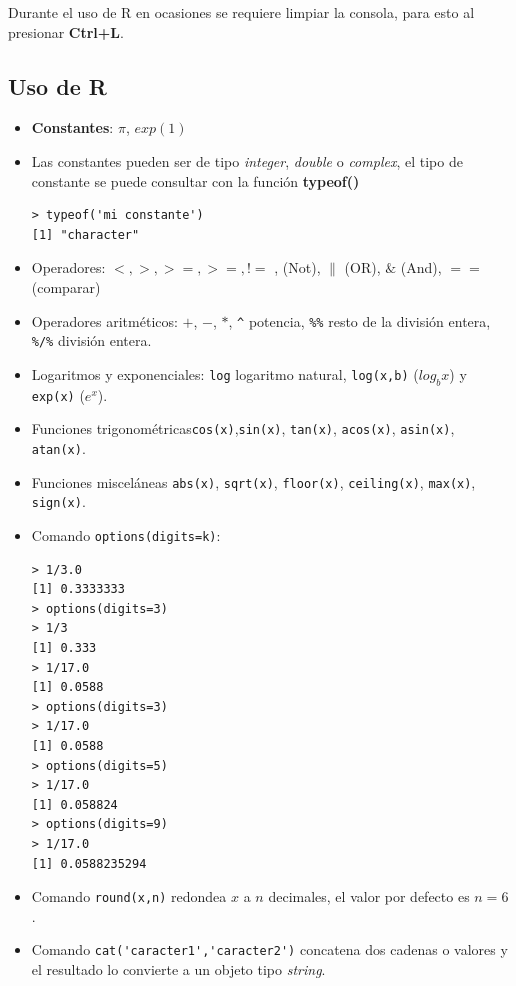 \documentclass[12pt]{article}
\begin{document}
Durante el uso de R en ocasiones se requiere limpiar la consola, para esto al presionar \textbf{Ctrl+L}.  


\subsection{Uso de R}

\begin{itemize}
\item \textbf{Constantes}: $\pi$, $exp(1)$

\item Las constantes pueden ser de tipo \textit{integer},  \textit{double} o \textit{complex}, el tipo de constante se puede consultar con la función \textbf{typeof()}

\begin{verbatim}
> typeof('mi constante')
[1] "character"
\end{verbatim}

\item Operadores: $<,>,>=,>=,!=$ ,$\!$ (Not),  $\|$ (OR), $\&$ (And),  $==$ (comparar)

\item Operadores aritméticos: $+$, $-$, $*$, \verb|^| potencia,  \verb|%%| resto de la división entera,  \verb|%/%| división entera.

\item Logaritmos y exponenciales: \verb|log| logaritmo natural,  \verb|log(x,b)| ($log_{b}x$) y \verb|exp(x)| ($e^x$).

\item Funciones trigonométricas\verb|cos(x)|,\verb|sin(x)|, \verb|tan(x)|, \verb|acos(x)|, \verb|asin(x)|, \verb|atan(x)|.

\item Funciones misceláneas \verb|abs(x)|,  \verb|sqrt(x)|,  \verb|floor(x)|,  \verb|ceiling(x)|, \verb|max(x)|,  \verb|sign(x)|.

\item Comando \verb|options(digits=k)|:

\begin{verbatim}
> 1/3.0
[1] 0.3333333
> options(digits=3)
> 1/3
[1] 0.333
> 1/17.0
[1] 0.0588
> options(digits=3)
> 1/17.0
[1] 0.0588
> options(digits=5)
> 1/17.0
[1] 0.058824
> options(digits=9)
> 1/17.0
[1] 0.0588235294
\end{verbatim}

\item Comando \verb|round(x,n)| redondea $x$ a $n$ decimales, el valor por defecto es $n=6$.

\item Comando \verb|cat('caracter1','caracter2')| concatena dos cadenas o valores y el resultado lo convierte a un objeto tipo \textit{string}.

\end{itemize}
\end{document}

